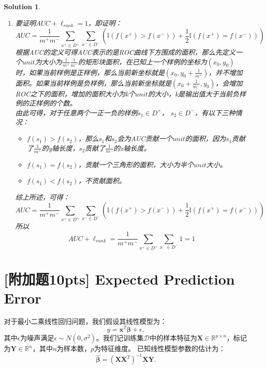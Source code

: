 \documentclass[a4paper,UTF8]{article}
\numberwithin{equation}{section}
\newtheorem*{mySol}{Solution}
\begin{document}
\begin{mySol}
\begin{enumerate}
\item 
要证明${AUC}+\ell_{rank}=1$，即证明：
\begin{equation}
AUC = \frac{1}{m^+m^-}\sum_{x^+\in D^+}\sum_{x^-\in D^-}\left(\mathbb I\left(f\left(x^+\right)>f\left(x^-\right)\right) + \frac{1}{2}\mathbb{I}\left(f\left(x^+\right)=f\left(x^-\right)\right)\right)	
\end{equation}
根据AUC的定义可得AUC表示的是ROC曲线下方围成的面积，那么先定义一个$unit$为大小为$\frac{1}{m^+}\frac{1}{m^-}$的矩形块面积，在已知上一个样例的坐标为$(x_0, y_0)$时，如果当前样例是正样例，那么当前新坐标就是$(x_0, y_0+\frac{1}{m^+})$，并不增加面积。如果当前样例是负样例，那么当前新坐标就是$(x_0+\frac{1}{m^-}, y_0)$，会增加ROC之下的面积，增加的面积大小为k个$unit$的大小，k是输出值大于当前负样例的正样例的个数。\\
由此可得，对于任意两个一正一负的样例$s_1\in D^+$， $s_2\in D^-$，有以下三种情况：
\begin{itemize}
\item $f(s_1) > f(s_2)$，那么$s_1$和$s_2$会为AUC贡献一个$unit$的面积，因为$s_1$贡献了$\frac{1}{m^+}$的y轴长度，$s_2$贡献了$\frac{1}{m^-}$的x轴长度。
\item $f(s_1) = f(s_2)$，贡献一个三角形的面积，大小为半个$unit$大小。
\item $f(s_1) < f(s_2)$，不贡献面积。
\end{itemize}
综上所述，可得：
\begin{equation}
AUC = \frac{1}{m^+m^-}\sum_{x^+\in D^+}\sum_{x^-\in D^-}\left(\mathbb I\left(f\left(x^+\right)>f\left(x^-\right)\right) + \frac{1}{2}\mathbb{I}\left(f\left(x^+\right)=f\left(x^-\right)\right)\right)
\end{equation}
所以
\begin{equation}
AUC + \ell_{rank} = \frac{1}{m^+m^-}\sum_{x^+\in D^+}\sum_{x^-\in D^-}1 = 1
\end{equation}
\end{enumerate}
\end{mySol}

\newpage
\section{[附加题10pts] Expected Prediction Error}
对于最小二乘线性回归问题，我们假设其线性模型为：
\begin{equation}
	y=\textbf{x}^T  \bm{ \beta } + \epsilon , 
\end{equation}
其中$\epsilon$为噪声满足$\epsilon\sim N(0,\sigma^2)$。我们记训练集$\mathcal{D}$中的样本特征为$\textbf{X}\in \mathbb{R}^{p \times n}$，标记为$\textbf{Y}\in \mathbb{R}^{n}$，其中$n$为样本数，$p$为特征维度。
已知线性模型参数的估计为：
\begin{equation}
	\hat{\bm{\beta}}=(\textbf{X}\textbf{X}^T)^{-1}\textbf{X}\textbf{Y}.	
\end{equation}
\end{document}
